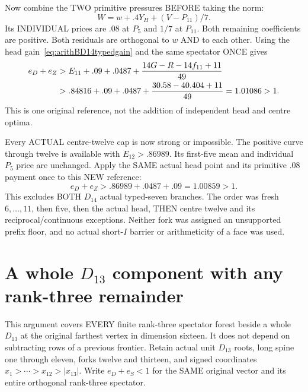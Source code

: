 \documentclass[11pt]{article}
\begin{document}
Now combine the TWO primitive pressures BEFORE
taking the norm:
\[
                         W=w+.4Y_H+(V-P_{11})/7 .
\]
Its INDIVIDUAL prices are \(.08\) at \(P_5\)
and \(1/7\) at \(P_{11}\).
Both remaining coefficients are positive.
Both residuals are orthogonal to \(w\) AND to
each other.
Using the head gain~\eqref{eq:arithBD14typedgain}
and the same spectator ONCE gives
\[
 \begin{split}
 e_D+e_Z
 &>E_{11}+.09+.0487+
                  {14G-R-14f_{11}+11\over49}\\
 &>.84816+.09+.0487+
                  {30.58-40.404+11\over49}
   =1.01086>1 .
 \end{split}
\]
This is one original reference, not the addition
of independent head and centre optima.

Every ACTUAL centre-twelve cap is now strong
or impossible.
The positive curve through twelve is available
with \(E_{12}>.86989\).
Its first-five mean and individual \(P_5\) price
are unchanged.
Apply the SAME actual head point and its primitive
\(.08\) payment once to this NEW reference:
\[
                       e_D+e_Z>.86989+.0487+.09=1.00859>1.
\]
This excludes BOTH \(D_{14}\) actual typed-seven
branches.
The order was fresh \(6,\ldots,11\), then five,
then the actual head, THEN centre twelve and its
reciprocal/continuous exceptions.
Neither fork was assigned an unsupported prefix
floor, and no actual short-\(I\) barrier or
arithmeticity of a face was used.

\section{A whole \(D_{13}\) component with any rank-three remainder}
\label{app:arithD13rankthree}

This argument covers EVERY finite rank-three spectator
forest beside a whole \(D_{13}\) at the original
farthest vertex in dimension sixteen.
It does not depend on subtracting rows of a
previous frontier.
Retain actual unit \(D_{13}\) roots, long spine
one through eleven, forks twelve and thirteen,
and signed coordinates
\(x_1>\cdots>x_{12}>|x_{13}|\).
Write \(e_D+e_S<1\) for the SAME original vector
and its entire orthogonal rank-three spectator.
\end{document}
